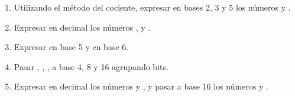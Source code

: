 \begin{enunciado}
  {\ejercicio}
  \begin{enumerate}[label=\alph{*})]
    \item Utilizando el método del cociente, expresar en bases 2, 3 y 5 los números
           y .

    \item Expresar en decimal los números ,  y
          .

    \item Expresar  en base 5 y  en base 6.

    \item Pasar , ,
          , a base 4, 8 y 16 agrupando bits.

    \item Expresar en decimal los números 
          y , y pasar a base 16 los números  y .
  \end{enumerate}
\end{enunciado}


